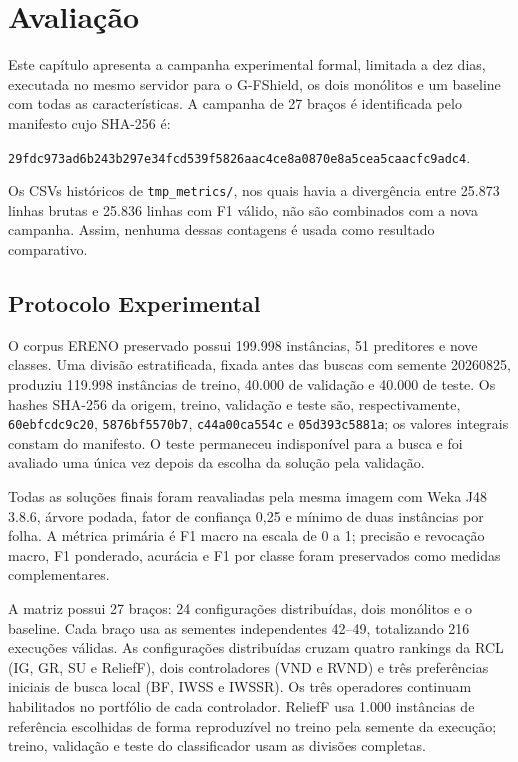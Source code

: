 \chapter{Avaliação}
\label{chapter:avaliacao}

Este capítulo apresenta a campanha experimental formal, limitada a dez dias, executada no mesmo servidor para o G-FShield, os dois monólitos e um baseline com todas as características. A campanha de 27 braços é identificada pelo manifesto cujo SHA-256 é:
\begin{center}
\small\texttt{29fdc973ad6b243b297e34fcd539f5826aac4ce8a0870e8a5cea5caacfc9adc4}.
\end{center}
Os CSVs históricos de \texttt{tmp\_metrics/}, nos quais havia a divergência entre 25.873 linhas brutas e 25.836 linhas com F1 válido, não são combinados com a nova campanha. Assim, nenhuma dessas contagens é usada como resultado comparativo.

\section{Protocolo Experimental}

O corpus ERENO preservado possui 199.998 instâncias, 51 preditores e nove classes. Uma divisão estratificada, fixada antes das buscas com semente 20260825, produziu 119.998 instâncias de treino, 40.000 de validação e 40.000 de teste. Os hashes SHA-256 da origem, treino, validação e teste são, respectivamente, \texttt{60ebfcdc9c20}, \texttt{5876bf5570b7}, \texttt{c44a00ca554c} e \texttt{05d393c5881a}; os valores integrais constam do manifesto. O teste permaneceu indisponível para a busca e foi avaliado uma única vez depois da escolha da solução pela validação.

Todas as soluções finais foram reavaliadas pela mesma imagem com Weka J48 3.8.6, árvore podada, fator de confiança 0,25 e mínimo de duas instâncias por folha. A métrica primária é F1 macro na escala de 0 a 1; precisão e revocação macro, F1 ponderado, acurácia e F1 por classe foram preservados como medidas complementares.

A matriz possui 27 braços: 24 configurações distribuídas, dois monólitos e o baseline. Cada braço usa as sementes independentes 42--49, totalizando 216 execuções válidas. As configurações distribuídas cruzam quatro rankings da RCL (IG, GR, SU e ReliefF), dois controladores (VND e RVND) e três preferências iniciais de busca local (BF, IWSS e IWSSR). Os três operadores continuam habilitados no portfólio de cada controlador. ReliefF usa 1.000 instâncias de referência escolhidas de forma reproduzível no treino pela semente da execução; treino, validação e teste do classificador usam as divisões completas.

